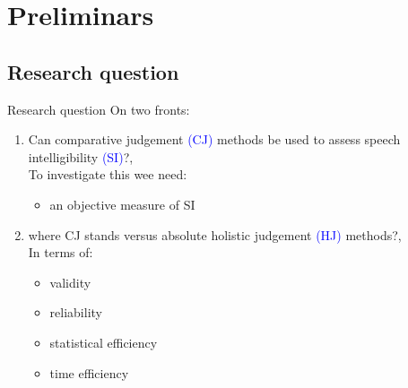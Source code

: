 \section{Preliminars}
%
%
\subsection{Research question}
%
%
\begin{frame}[t, negative]
	\subsectionpage
\end{frame}
%
%
\begin{frame}
	{Research question}
	On two fronts:
	\begin{enumerate}
		\item Can comparative judgement \textcolor{blue}{(CJ)} methods be used to assess speech intelligibility \textcolor{blue}{(SI)}?, \\
		To investigate this wee need:
		\begin{itemize}
			\item an \alert{objective measure} of SI
		\end{itemize}
		\item where CJ stands versus absolute holistic judgement \textcolor{blue}{(HJ)} methods?, \\ 
		In terms of:
		\begin{itemize}
			\item validity
			\item reliability
			\item statistical efficiency
			\item time efficiency
		\end{itemize}
	\end{enumerate}
\end{frame}
%
%
